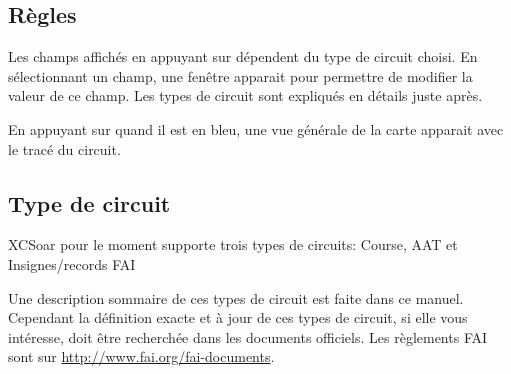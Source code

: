 \subsection*{Règles}
Les champs affichés en appuyant sur   dépendent du type de circuit choisi. En sélectionnant un champ, une fenêtre apparait pour permettre de modifier la valeur de ce champ. Les types de circuit sont expliqués en détails juste après.

En appuyant sur  quand il est en bleu, une vue générale de la carte apparait avec le tracé du circuit.

\subsection*{Type de circuit}
XCSoar pour le moment supporte trois types de circuits: Course, AAT et Insignes/records FAI

Une description sommaire de ces types de circuit est faite dans ce manuel. Cependant la définition exacte et à jour de ces types de circuit, si elle vous intéresse, doit être recherchée  dans les documents officiels. Les règlements FAI sont sur  \url{http://www.fai.org/fai-documents}. 

